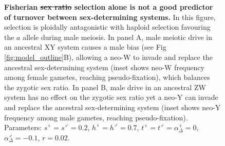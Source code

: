 \documentclass[10pt,letterpaper]{article}
\providecommand{\DIFaddtex}[1]{{\protect\color{blue}\uwave{#1}}} %
\providecommand{\DIFdeltex}[1]{{\protect\color{red}\sout{#1}}}                      %
\providecommand{\DIFaddFL}[1]{\DIFadd{#1}} %
\providecommand{\DIFdelFL}[1]{\DIFdel{#1}} %
\providecommand{\DIFaddbeginFL}{} %
\providecommand{\DIFaddendFL}{} %
\providecommand{\DIFdelbeginFL}{} %
\providecommand{\DIFdelendFL}{} %
\providecommand{\DIFadd}[1]{\texorpdfstring{\DIFaddtex{#1}}{#1}} %
\providecommand{\DIFdel}[1]{\texorpdfstring{\DIFdeltex{#1}}{}} %
\begin{document}
\begin{figure}[!h]
\centering
\caption{
{\bf Fisherian \DIFdelbeginFL \DIFdelFL{sex ratio }\DIFdelendFL \DIFaddbeginFL \DIFaddFL{sex-ratio }\DIFaddendFL selection alone is not a good predictor of turnover between sex-determining systems.}
In this figure, selection is ploidally antagonistic with haploid selection favouring the $a$ allele during male meiosis.
In panel A, male meiotic drive in an ancestral XY system causes a male bias (see Fig \ref{fig:model_outline}B), allowing a neo-W to invade and replace the ancestral sex-determining system (inset shows neo-W frequency among female gametes, reaching pseudo-fixation), which balances the zygotic sex ratio.
In panel B, male drive in an ancestral ZW system has no effect on the zygotic sex ratio yet a neo-Y can invade and replace the ancestral sex-determining system (inset shows neo-Y frequency among male gametes, reaching pseudo-fixation). 
Parameters:  $s^\female =s^\male = 0.2$, $h^\female = h^\male = 0.7$, $t^\female = t^\male = \alpha^\female_\Delta = 0$, $\alpha^\male_\Delta = -0.1$, $r=0.02$.
}
\label{fig:SexRatioBad}
\end{figure}
\end{document}
